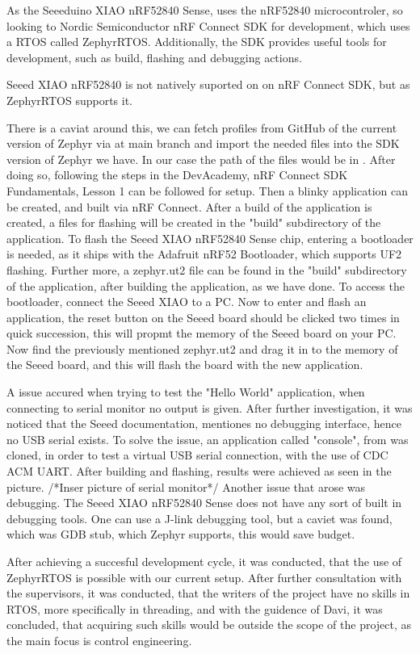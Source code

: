 \documentclass[a4paper,11pt]{article}
\begin{document}
As the Seeeduino XIAO nRF52840 Sense, uses the nRF52840 microcontroler, so looking to Nordic Semiconductor nRF Connect SDK for development, which uses a RTOS called ZephyrRTOS.
Additionally, the SDK provides useful tools for development, such as build, flashing and debugging actions. \cite{nRF}


Seeed XIAO nRF52840 is not natively suported on on nRF Connect SDK, but as ZephyrRTOS supports it. \cite{docsZephyr}

There is a caviat around this, we can fetch profiles from GitHub of the current version of Zephyr via  at main branch \cite{gitZephyr} and import the needed files into the SDK version of Zephyr we have.
In our case the path of the files would be in  .
After doing so, following the steps in the DevAcademy, nRF Connect SDK Fundamentals, Lesson 1 can be followed for setup. Then a blinky application can be created, and built via nRF Connect.
After a build of the application is created, a files for flashing will be created in the "build" subdirectory of the application.
To flash the Seeed XIAO nRF52840 Sense chip, entering a bootloader is needed, as it ships with the Adafruit nRF52 Bootloader, which supports UF2 flashing. \cite{docsZephyr}
Further more, a zephyr.ut2 file can be found in the "build" subdirectory of the application, after building the application, as we have done.
To access the bootloader, connect the Seeed XIAO to a PC.
Now to enter and flash an application, the reset button on the Seeed board should be clicked two times in quick succession, this will propmt the memory of the Seeed board on your PC.
Now find the previously mentioned zephyr.ut2 and drag it in to the memory of the Seeed board, and this will flash the board with the new application.

A issue accured when trying to test the "Hello World" application, when connecting to serial monitor no output is given.
After further investigation, it was noticed that the Seeed documentation, mentiones no debugging interface, hence no USB serial exists.
To solve the issue, an application called "console", from  was cloned, in order to test a virtual USB serial connection, with the use of CDC ACM UART. \cite{gitZephyr}
After building and flashing, results were achieved as seen in the picture.
/*Inser picture of serial monitor*/
Another issue that arose was debugging. The Seeed XIAO nRF52840 Sense does not have any sort of built in debugging tools. \cite{wikiSeeed}
One can use a J-link debugging tool, but a caviet was found, which was GDB stub, which Zephyr supports, this would save budget. \cite{docsZephyr}

After achieving a succesful development cycle, it was conducted, that the use of ZephyrRTOS is possible with our current setup.
After further consultation with the supervisors, it was conducted, that the writers of the project have no skills in RTOS, more specifically in threading, and with the guidence of Davi, it was concluded, that acquiring such skills would be outside the scope of the project, as the main focus is control engineering.



\end{document}
